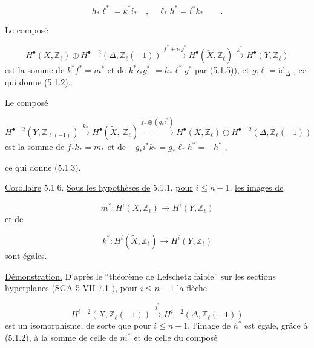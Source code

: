 \begin{equation}\tag{5.1.5}
h_*\ell^* = k^*i_* \quad , \quad \ell_*h^* = i^*k_* \qquad .
\end{equation}


Le composé

\begin{equation*}
H^{\bullet}(X,\mathbb{Z}_{\ell}) \oplus H^{\bullet-2}(\Delta,\mathbb{Z}_{\ell}(-1)) \stackrel{f^*+i_*g^*}{\longrightarrow} H^{\bullet}(\widetilde{X},\mathbb{Z}_{\ell}) \stackrel{k^*}{\longrightarrow} H^{\bullet}(Y,\mathbb{Z}_{\ell})
\end{equation*}
est la somme de $k^*f^* = m^*$ et de $k^*i_*g^*$ $= h_*\ell^*g^*$ par (5.1.5)), et $g.\ell = \mathrm{id}_{\Delta}$ , ce qui donne (5.1.2).

Le composé

\begin{equation*}
H^{\bullet-2}(Y,\mathbb{Z}_{\ell(-1)}) \stackrel{k_*}{\longrightarrow} H^{\bullet}(\widetilde{X},\ \mathbb{Z}_{\ell}) \stackrel{f_*\oplus(g_*i^*)}{\longrightarrow} H^{\bullet}(X,\mathbb{Z}_{\ell}) \oplus H^{\bullet-2}(\Delta,\mathbb{Z}_{\ell}(-1))
\end{equation*}
est la somme de $f_*k_* = m_*$ et de $-g_*i^*k_* = g_*\ell_*h^* = -h^*$ ,

ce qui donne (5.1.3).

\underline{Corollaire} 5.1.6. \underline{Sous les hypothèses de} 5.1.1, \underline{pour} $i \leq n-1$, \underline{les images de}

\begin{equation*}
m^* : H^i(X,\mathbb{Z}_{\ell}) \longrightarrow H^i(Y,\mathbb{Z}_{\ell})
\end{equation*}
\underline{et de}

\begin{equation*}
k^* : H^i(\widetilde{X},\mathbb{Z}_{\ell}) \longrightarrow H^i(Y,\mathbb{Z}_{\ell})
\end{equation*}
\underline{sont égales}.

\underline{Démonstration.} D'après le ``théorème de Lefschetz faible'' sur les sections hyperplanes (SGA 5 VII 7.1  ), pour $i \leq n-1$ la flèche

\begin{equation}\tag{5.1.7}
H^{i-2}(X,\mathbb{Z}_{\ell}(-1)) \stackrel{j^*}{\longrightarrow} H^{i-2}(\Delta,\mathbb{Z}_{\ell}(-1))
\end{equation}
est un isomorphisme, de sorte que pour $i \leq n-1$, l'image de $h^*$ est égale, grâce à (5.1.2), à la somme de celle de $m^*$ et de celle du composé

